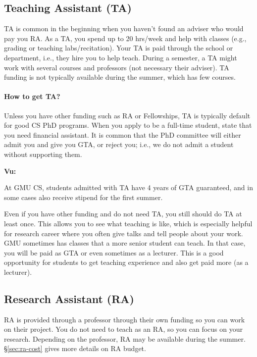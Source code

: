\documentclass[oneside,11pt]{memoir}
\newenvironment{commentbox}[1][]{
\small
    \begin{mybox}
    {\small \textbf{#1}}
 }{
   \end{mybox}
}
\begin{document}
\subsection{Teaching Assistant (TA)}\label{sec:ta}

TA is common in the beginning when you haven't found an adviser who would pay you RA. As a TA, you spend up to 20 hrs/week and help with classes (e.g., grading or teaching labs/recitation). Your TA is paid through the school or department, i.e., they hire you to help teach.  During a semester, a TA might work with several courses and professors (not necessary their adviser).  TA funding is not typically available during the summer, which has few courses.

\paragraph{How to get TA?}  Unless you have other funding such as RA or Fellowships, TA is typically default for good CS PhD programs. When you apply to be a full-time student,  state that you need financial assistant. It is common that the PhD committee will either admit you and give you GTA, or reject you; i.e., we do not admit a student without supporting them.  

\begin{commentbox}[Vu:]
At GMU CS, students admitted with TA have  4 years of GTA guaranteed, and in some cases also receive  stipend for the first summer.
\end{commentbox}

Even if you have other funding and do not need TA, you still should do TA at least once.  This allows you to see what teaching is like, which is especially helpful for research career where you often give talks and tell people about your work. GMU sometimes has classes that a more senior student can teach.  In that case, you will be paid as GTA or even sometimes as a lecturer.  This is a good opportunity for students to get teaching experience and also get paid more (as a lecturer).

\subsection{Research Assistant (RA)}
RA is provided through a professor through their own funding so you can work on their project.  
You do not need to teach as an RA, so you can focus on your research. Depending on the professor, RA may be available during the summer. \S\ref{sec:ra-cost} gives more details on RA budget.
\end{document}
